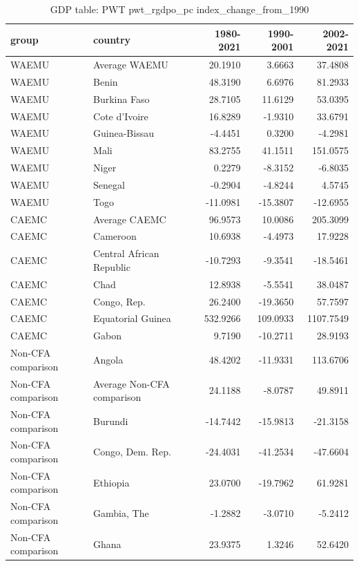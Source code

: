 \begin{table}

\caption{GDP table: PWT pwt_rgdpo_pc index_change_from_1990}
\centering
\begin{tabular}[t]{llrrr}
\toprule
group & country & 1980-2021 & 1990-2001 & 2002-2021\\
\midrule
WAEMU & Average WAEMU & 20.1910 & 3.6663 & 37.4808\\
WAEMU & Benin & 48.3190 & 6.6976 & 81.2933\\
WAEMU & Burkina Faso & 28.7105 & 11.6129 & 53.0395\\
WAEMU & Cote d'Ivoire & 16.8289 & -1.9310 & 33.6791\\
WAEMU & Guinea-Bissau & -4.4451 & 0.3200 & -4.2981\\
\addlinespace
WAEMU & Mali & 83.2755 & 41.1511 & 151.0575\\
WAEMU & Niger & 0.2279 & -8.3152 & -6.8035\\
WAEMU & Senegal & -0.2904 & -4.8244 & 4.5745\\
WAEMU & Togo & -11.0981 & -15.3807 & -12.6955\\
CAEMC & Average CAEMC & 96.9573 & 10.0086 & 205.3099\\
\addlinespace
CAEMC & Cameroon & 10.6938 & -4.4973 & 17.9228\\
CAEMC & Central African Republic & -10.7293 & -9.3541 & -18.5461\\
CAEMC & Chad & 12.8938 & -5.5541 & 38.0487\\
CAEMC & Congo, Rep. & 26.2400 & -19.3650 & 57.7597\\
CAEMC & Equatorial Guinea & 532.9266 & 109.0933 & 1107.7549\\
\addlinespace
CAEMC & Gabon & 9.7190 & -10.2711 & 28.9193\\
Non-CFA comparison & Angola & 48.4202 & -11.9331 & 113.6706\\
Non-CFA comparison & Average Non-CFA comparison & 24.1188 & -8.0787 & 49.8911\\
Non-CFA comparison & Burundi & -14.7442 & -15.9813 & -21.3158\\
Non-CFA comparison & Congo, Dem. Rep. & -24.4031 & -41.2534 & -47.6604\\
\addlinespace
Non-CFA comparison & Ethiopia & 23.0700 & -19.7962 & 61.9281\\
Non-CFA comparison & Gambia, The & -1.2882 & -3.0710 & -5.2412\\
Non-CFA comparison & Ghana & 23.9375 & 1.3246 & 52.6420\\

\end{tabular}
\end{table}
